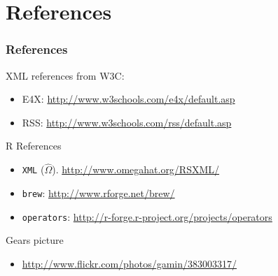 \documentclass[smaller]{beamer}
\newcommand{\rfun}[1]{\texttt{#1}}
\begin{document}
{
 \begin{frame}[fragile][plain]
 \end{frame}
}



\begin{frame}[fragile][plain]

\end{frame}
 
\section{References}

\begin{frame}[fragile]
\frametitle{References}

XML references from W3C: 
\begin{itemize}
 \item E4X: \url{http://www.w3schools.com/e4x/default.asp}
 \item RSS: \url{http://www.w3schools.com/rss/default.asp}
\end{itemize}

R References
\begin{itemize}
 \item \rfun{XML} ($\hat{\Omega}$). \url{http://www.omegahat.org/RSXML/}
 \item \rfun{brew}: \url{http://www.rforge.net/brew/}
 \item \rfun{operators}: \url{http://r-forge.r-project.org/projects/operators}
\end{itemize}

Gears picture
\begin{itemize}
 \item \url{http://www.flickr.com/photos/gamin/383003317/}
\end{itemize}


\end{frame}
\end{document}

